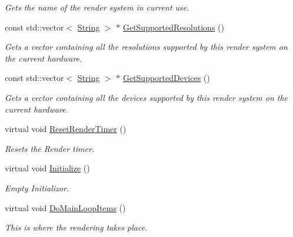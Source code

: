 \begin{DoxyCompactItemize}
\begin{DoxyCompactList}\small\item\em Gets the name of the render system in current use. \item\end{DoxyCompactList}\item 
const std::vector$<$ \hyperlink{namespacephys_aa03900411993de7fbfec4789bc1d392e}{String} $>$ $\ast$ \hyperlink{classphys_1_1GraphicsManager_a4bfa1c07f2c2305ec892e603a71c6341}{GetSupportedResolutions} ()
\begin{DoxyCompactList}\small\item\em Gets a vector containing all the resolutions supported by this render system on the current hardware. \item\end{DoxyCompactList}\item 
const std::vector$<$ \hyperlink{namespacephys_aa03900411993de7fbfec4789bc1d392e}{String} $>$ $\ast$ \hyperlink{classphys_1_1GraphicsManager_a7d1cce1c63d5678266337323da1e8ff5}{GetSupportedDevices} ()
\begin{DoxyCompactList}\small\item\em Gets a vector containing all the devices supported by this render system on the current hardware. \item\end{DoxyCompactList}\item 
virtual void \hyperlink{classphys_1_1GraphicsManager_ac4b864de93827447bf8f47487da3bf32}{ResetRenderTimer} ()
\begin{DoxyCompactList}\small\item\em Resets the Render timer. \item\end{DoxyCompactList}\item 
virtual void \hyperlink{classphys_1_1GraphicsManager_a554572de5d1cdce37aa1760d6e6e039c}{Initialize} ()
\begin{DoxyCompactList}\small\item\em Empty Initializor. \item\end{DoxyCompactList}\item 
virtual void \hyperlink{classphys_1_1GraphicsManager_a72e5dc563c6947cded348f19d3df41ee}{DoMainLoopItems} ()
\begin{DoxyCompactList}\small\item\em This is where the rendering takes place. \item\end{DoxyCompactList}\item 

\end{DoxyCompactItemize}
